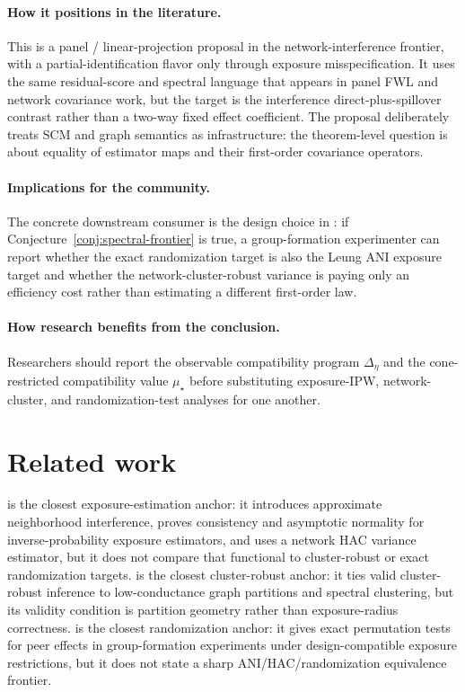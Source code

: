 \documentclass[11pt]{article}
\theoremstyle{definition}
\theoremstyle{plain}
\theoremstyle{remark}
\begin{document}
\paragraph{How it positions in the literature.}
This is a panel / linear-projection proposal in the network-interference
frontier, with a partial-identification flavor only through exposure
misspecification.  It uses the same residual-score and spectral language that
appears in panel FWL and network covariance work, but the target is the
interference direct-plus-spillover contrast rather than a two-way fixed effect
coefficient.  The proposal deliberately treats SCM and graph semantics as
infrastructure: the theorem-level question is about equality of estimator
maps and their first-order covariance operators.

\paragraph{Implications for the community.}
The concrete downstream consumer is the design choice in
\citet{BasseDingFellerToulis2024}: if Conjecture~\ref{conj:spectral-frontier}
is true, a group-formation experimenter can report whether the exact
randomization target is also the Leung ANI exposure target and whether the
network-cluster-robust variance is paying only an efficiency cost rather than
estimating a different first-order law.

\paragraph{How research benefits from the conclusion.}
Researchers should report the observable compatibility program
\(\Delta_\eta\) and the cone-restricted compatibility value \(\mu_\star\) before
substituting exposure-IPW, network-cluster, and randomization-test analyses for
one another.

\section{Related work}
\citet{Leung2022ANI} is the closest exposure-estimation anchor: it introduces
approximate neighborhood interference, proves consistency and asymptotic
normality for inverse-probability exposure estimators, and uses a network HAC
variance estimator, but it does not compare that functional to
cluster-robust or exact randomization targets.  \citet{Leung2023NCRI} is the
closest cluster-robust anchor: it ties valid cluster-robust inference to
low-conductance graph partitions and spectral clustering, but its validity
condition is partition geometry rather than exposure-radius correctness.
\citet{BasseDingFellerToulis2024} is the closest randomization anchor: it gives
exact permutation tests for peer effects in group-formation experiments under
design-compatible exposure restrictions, but it does not state a sharp
ANI/HAC/randomization equivalence frontier.
\end{document}
